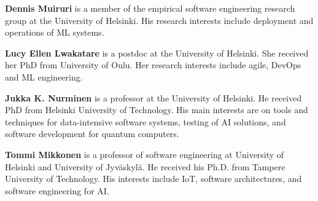 \textbf{Dennis Muiruri} is a member of the empirical software engineering research group at the University of Helsinki. His research interests include deployment and operations of ML systems.

\textbf{Lucy Ellen Lwakatare} is a postdoc at the University of Helsinki. She received her PhD from University of Oulu.
Her research interests include agile, DevOps and ML engineering.

\textbf{Jukka K. Nurminen} is a professor at the University of Helsinki. 
He received PhD from Helsinki University of Technology. His main interests are on tools and techniques for data-intensive software systems, testing of AI solutions, and software development for quantum computers.

\textbf{Tommi Mikkonen} is a professor of software engineering at University of Helsinki and University of Jyv\"{a}skyl\"{a}. He received his Ph.D. from Tampere University of Technology. His interests include IoT, software architectures, and software engineering for AI.
